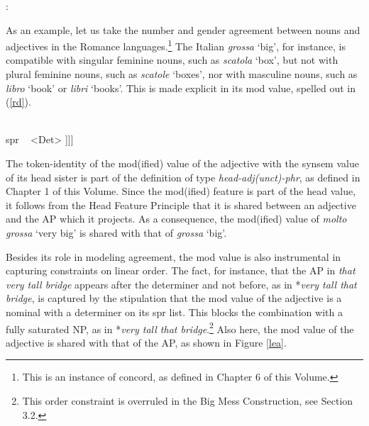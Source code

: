 \documentclass[output=paper]{langsci/langscibook}
\begin{document}
\begin{exe} 
 : \begin{avm} 
                          \end{avm} 
\end{exe} 

\noindent
As an example, let us take the number and gender agreement 
between nouns and adjectives in the Romance languages.\footnote{This is an 
instance of concord, as defined in 
Chapter 6 of this Volume.}  
The Italian {\it grossa\/} `big', for instance, 
is compatible with singular feminine nouns, such as {\it scatola\/} `box', 
but not with plural feminine nouns, such as {\it scatole\/} `boxes', nor
with masculine nouns, such as {\it libro\/} `book' or {\it libri\/} `books'. 
This is made explicit in its {\sc mod} value, spelled out in (\ref{rd}). 

\begin{exe} 
\ex\label{rd}
\begin{avm}
[{\it category\/}                              \\
 head [{\it adjective}                         \\
       mod|loc|cat [head [{\it noun\/}          \\
                          number ~ {\it sing\/} \\
                          gender ~ {\it fem\/}] \\
                    spr ~ <Det> ]]]
\end{avm}
\end{exe}

\noindent
The token-identity of the {\sc mod(ified)} value of the adjective
with the {\sc synsem} value of its head sister is part of the 
definition of type {\it head-adj(unct)-phr}, as defined in 
Chapter 1 of this Volume. 
Since the {\sc mod(ified)} feature is part of the {\sc head} value, it follows from the 
Head Feature Principle that it is shared between an adjective 
and the AP which it projects. As a consequence, the {\sc mod(ified)} value of 
{\it molto grossa\/} `very big' is shared with that of {\it grossa\/} `big'. 
 
Besides its role in modeling agreement, the {\sc mod} value is also instrumental 
in capturing constraints on linear order.  
The fact, for instance, that the AP in {\it that very tall bridge\/} appears 
after the determiner and not before, as in *{\it very tall that bridge},
is captured by the stipulation that the {\sc mod} value of the adjective 
is a nominal with a determiner on its {\sc spr} list. This blocks the 
combination with a fully saturated NP, as in 
*{\it very tall that bridge}.\footnote{This order constraint is overruled in 
the Big Mess Construction, see Section 3.2.} Also here, the {\sc mod} value of 
the adjective is shared with that of the AP, as shown in Figure \ref{lea}. 
\end{document}
